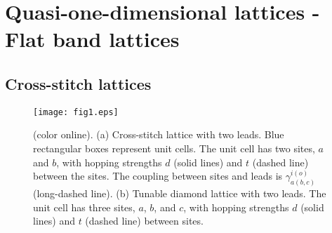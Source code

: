 \documentclass[twocolumn,showpacs,epsfig,pre]{revtex4}
\newcommand{\figsizeone}{0.48}
\begin{document}
\section{Quasi-one-dimensional lattices - Flat band lattices}

\subsection{Cross-stitch lattices}

\begin{figure}
\begin{center}
\texttt{[image: fig1.eps]}
\caption{(color online).
(a) Cross-stitch lattice with two leads. Blue rectangular boxes represent unit cells.
The unit cell has two sites, $a$ and $b$, with hopping strengths $d$ (solid lines) and $t$ (dashed line) between the sites.
The coupling between sites and leads is $\gamma_{a(b,c)}^{i(o)}$ (long-dashed line).
(b) Tunable diamond lattice with two leads. The unit cell has three sites, $a$, $b$, and $c$, with hopping strengths $d$ (solid lines) and $t$ (dashed line) between sites.
}
\label{fig1}
\end{center}
\end{figure}
\end{document}
